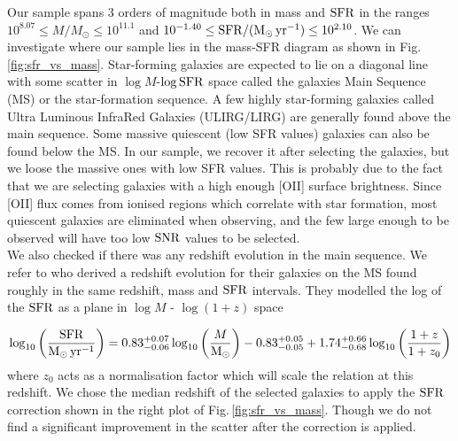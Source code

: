 Our sample spans 3 orders of magnitude both in mass and $\rm{SFR}$ in the ranges $10^{8.07} \leq M / \si{M_{\odot}} \leq  10^{11.1}$ and $10^{-1.40} \leq \rm{SFR} / ( \si{M_{\odot}. yr^{-1} }) \leq 10^{2.10}$. We can investigate where our sample lies in the mass-SFR diagram as shown in Fig.\,\ref{fig:sfr_vs_mass}. Star-forming galaxies are expected to lie on a diagonal line with some scatter in $\log M$-$\log \rm{SFR}$ space called the galaxies Main Sequence (MS) or the star-formation sequence. A few highly star-forming galaxies called Ultra Luminous InfraRed Galaxies (ULIRG/LIRG) are generally found above the main sequence. Some massive quiescent (low SFR values) galaxies can also be found below the MS. In our sample, we recover it after selecting the galaxies, but we loose the massive ones with low SFR values. This is probably due to the fact that we are selecting galaxies with a high enough [OII] surface brightness. Since [OII] flux comes from ionised regions which correlate with star formation, most quiescent galaxies are eliminated when observing, and the few large enough to be observed will have too low $\rm{SNR}$ values to be selected.  \\

We also checked if there was any redshift evolution in the main sequence. We refer to  who derived a redshift evolution for their galaxies on the MS found roughly in the same redshift, mass and $\rm{SFR}$ intervals. They modelled the log of the $\rm{SFR}$ as a plane in $\log M$ - $\log (1 + z)$ space 

\begin{equation}
	\log_{10} \left ( \frac{\rm{SFR}}{\si{M_{\odot} . yr^{-1}}} \right ) = 0.83_{-0.06}^{+0.07} \log_{10} \left ( \frac{M}{\si{M_{\odot}}} \right ) - 0.83^{+0.05}_{-0.05} + 1.74_{-0.68}^{+0.66} \log_{10} \left ( \frac{1+z}{1+z_0} \right )
	\label{eq:SFR_corrected_redshift}
\end{equation}
where $z_0$ acts as a normalisation factor which will scale the relation at this redshift. We chose the median redshift of the selected galaxies to apply the $\rm{SFR}$ correction shown in the right plot of Fig.\,\ref{fig:sfr_vs_mass}. Though we do not find a significant improvement in the scatter after the correction is applied.



 
